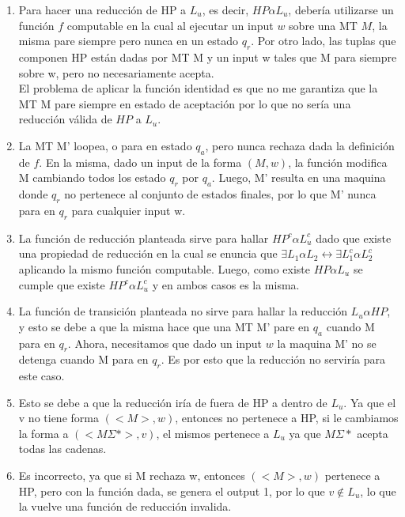 \documentclass[lnbip]{svmultln}
\begin{document}
\begin{enumerate}
    \item Para hacer una reducción de HP a $L_u$, es decir, $HP \alpha L_u$, debería utilizarse un función $f$ computable en la cual al ejecutar un input $w$ sobre una MT $M$, la misma pare siempre pero nunca en un estado $q_r$. Por otro lado, las tuplas que componen HP están dadas por MT M y un input w tales que M para siempre sobre w, pero no necesariamente acepta. \\
    
    El problema de aplicar la función identidad es que no me garantiza que la MT M pare siempre en estado de aceptación por lo que no sería una reducción válida de $HP$ a $L_u$. \\
    
    \item La MT M' loopea, o para en estado $q_a$, pero nunca rechaza dada la definición de $f$. En la misma, dado un input de la forma $(M, w)$, la función modifica M cambiando todos los estado $q_r$ por $q_a$. Luego, M' resulta en una maquina donde $q_r$ no pertenece al conjunto de estados finales, por lo que M' nunca para en $q_r$ para cualquier input w. \\
    
    \item La función de reducción planteada sirve para hallar $HP^{c} \alpha L_u^{c}$ dado que existe una propiedad de reducción en la cual se enuncia que $\exists L_{1} \alpha L_{2} \leftrightarrow \exists L_{1}^c \alpha L_{2}^c$ aplicando la mismo función computable. Luego, como existe $HP \alpha L_u$ se cumple que existe $HP^c \alpha L_{u}^c$ y en ambos casos es la misma. \\
    
    \item La función de transición planteada no sirve para hallar la reducción $L_u \alpha HP$, y esto se debe a que la misma hace que una MT M' pare en $q_a$ cuando M para en $q_r$. Ahora, necesitamos que dado un input $w$ la maquina M' no se detenga cuando M para en $q_r$. Es por esto que la reducción no serviría para este caso. \\
    
    \item Esto se debe a que la reducción iría de fuera de HP a dentro de $L_u$. Ya que el v no tiene forma $(<M>,w)$, entonces no pertenece a HP, si le cambiamos la forma a $(<M\Sigma *>, v)$, el mismos pertenece a $L_u$ ya que $M\Sigma *$ acepta todas las cadenas. \\
    
    \item Es incorrecto, ya que si M rechaza w, entonces $(<M>,w)$ pertenece a HP, pero con la función dada, se genera el output 1, por lo que $v \notin L_u$, lo que la vuelve una función de reducción invalida. \\
\end{enumerate}
\end{document}
